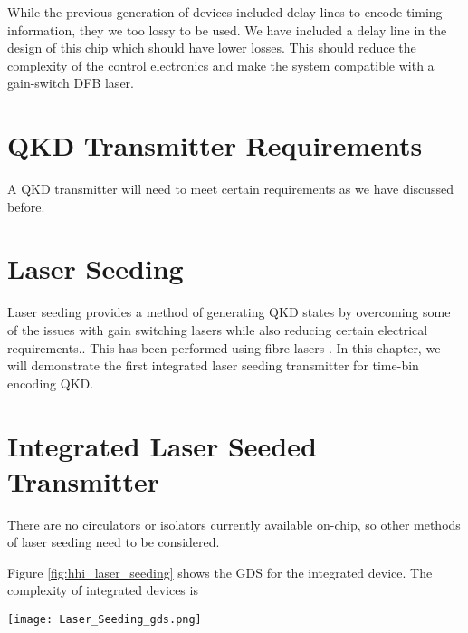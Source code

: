 While the previous generation of devices included delay lines to encode timing information, they we too lossy to be used. We have included a delay line in the design of this chip which should have lower losses. This should reduce the complexity of the control electronics and make the system compatible with a gain-switch DFB laser.


\section{QKD Transmitter Requirements}
\label{sec:sec06}

A \ac{QKD} transmitter will need to meet certain requirements as we have discussed before.

\section{Laser Seeding}

Laser seeding provides a method of generating \ac{QKD} states by overcoming some of the issues with gain switching lasers while also reducing certain electrical requirements.. This has been performed using fibre lasers \cite{}. In this chapter, we will demonstrate the first integrated laser seeding transmitter for time-bin encoding \ac{QKD}. 

\section{Integrated Laser Seeded Transmitter}

There are no circulators or isolators currently available on-chip, so other methods of laser seeding need to be considered.

Figure \ref{fig:hhi_laser_seeding} shows the GDS for the integrated device. The complexity of integrated devices is 

\begin{sidewaysfigure}
	\centering
	\texttt{[image: Laser\_Seeding\_gds.png]}
	\caption[InP laser seeding transmitter with QRNG]{This shows the layout of the laser seeded transmitter device fabricated by HHI. The chip measures \SI[product-units=power]{6x4}{mm} and contains two laser seeding prototype circuits, a homodyne \ac{qrng} and test structure to measure laser and waveguide performances. This demonstrates the complexity and compactness possible in the integrated platform.}
	\label{fig:hhi_laser_seeding}
\end{sidewaysfigure}

